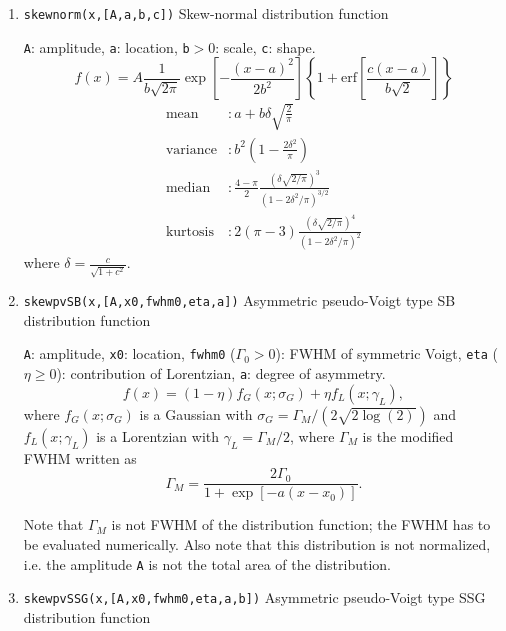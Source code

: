 \documentclass[reprint,showpacs,prb,nofootinbib,amsmath,amssymb]{revtex4-1}
\begin{document}
\begin{enumerate}
\item \verb|skewnorm(x,[A,a,b,c])| Skew-normal distribution function~\cite{McLaughlin,skewnorm}

\verb|A|: amplitude, \verb|a|: location, \verb|b|$>0$: scale, \verb|c|: shape.
\begin{equation}
f(x)=A\frac{1}{b\sqrt{2\pi}}\exp\left[-\frac{(x-a)^2}{2b^2}\right] \left\lbrace 1+\mathrm{erf}\left[\frac{c(x-a)}{b\sqrt{2}}\right]\right\rbrace  \nonumber
\end{equation}
\begin{align}
	\mbox{mean} 		&: \mbox{$a+b\delta\sqrt{\frac{2}{\pi}}$} \nonumber \\
	\mbox{variance}		&: \mbox{$b^2\left(1-\frac{2\delta^2}{\pi}\right)$} \nonumber \\
	\mbox{median}       &: \mbox{$\frac{4-\pi}{2}\frac{(\delta\sqrt{2/\pi})^3}{(1-2\delta^2/\pi)^{3/2}}$}  \nonumber \\
	\mbox{kurtosis}     &: \mbox{$2(\pi-3)\frac{(\delta\sqrt{2/\pi})^4}{(1-2\delta^2/\pi)^2}$}  \nonumber
\end{align}
where $\delta=\frac{c}{\sqrt{1+c^2}}$.

\item \verb|skewpvSB(x,[A,x0,fwhm0,eta,a])| Asymmetric pseudo-Voigt type SB distribution function~\cite{skewpvSB}

\verb|A|: amplitude, \verb|x0|: location, \verb|fwhm0| ($\Gamma_0>0$): FWHM of symmetric Voigt, \verb|eta| ($\eta\geq0$): contribution of Lorentzian, \verb|a|: degree of asymmetry.
\begin{equation}
f(x)=(1-\eta)f_G(x;\sigma_G)+\eta f_L(x;\gamma_L), 	\nonumber
\end{equation}
where $f_G(x;\sigma_G)$ is a Gaussian with $\sigma_G=\Gamma_M/(2\sqrt{2\log(2)})$ and $f_L(x;\gamma_L)$ is a Lorentzian with $\gamma_L=\Gamma_M/2$, where $\Gamma_M$ is the modified FWHM written as
\begin{equation}
\Gamma_M=\frac{2\Gamma_0}{1+\exp\left[-a(x-x_0)\right]}. \nonumber
\end{equation}

Note that $\Gamma_M$ is not FWHM of the distribution function; the FWHM has to be evaluated numerically. Also note that this distribution is not normalized, i.e. the amplitude \verb|A| is not the total area of the distribution.

\item \verb|skewpvSSG(x,[A,x0,fwhm0,eta,a,b])| Asymmetric pseudo-Voigt type SSG distribution function~\cite{skewpvSSG}


\end{enumerate}
\end{document}
